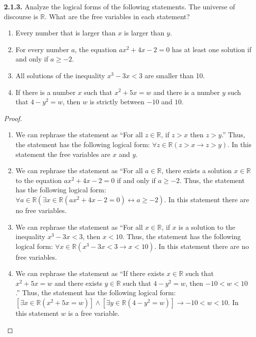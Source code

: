 \documentclass[12pt]{amsart}
\newenvironment{statement}[1]{\smallskip\noindent\color[rgb]{.6627, .3529, .6314} {\bf #1.}}{}
\theoremstyle{definition}
\theoremstyle{remark}
\newcommand{\BR}{\mathbb R}
\begin{document}
\begin{statement}{2.1.3}
Analyze the logical forms of the following statements.
The universe of discourse is $\BR$.
What are the free variables in each statement?
\begin{enumerate}
	\item Every number that is larger than $x$ is larger than $y$.
	
	\item For every number $a$, the equation $ax^2 + 4x - 2 = 0$ has at least one solution if and only if $a \geq -2$.
	
	\item All solutions of the inequality $x^3 - 3x < 3$ are smaller than 10.
	
	\item If there is a number $x$ such that $x^2 + 5x = w$ and there is a number $y$ such that $4 - y^2 = w$, then $w$ is strictly between $-10$ and $10$.
\end{enumerate}
\end{statement}

\begin{proof}
\hfill
\begin{enumerate}
	\item We can rephrase the statement as ``For all $z \in \BR$, if $z > x$ then $z > y$.''
	Thus, the statement has the following logical form:
	$\forall z \in \BR (z > x \rightarrow z > y)$.
	In this statement the free variables are $x$ and $y$.
	
	\item We can rephrase the statement as ``For all $a \in \BR$, there exists a solution $x \in \BR$ to the equation $ax^2 + 4x - 2 = 0$ if and only if $a \geq -2$.
	Thus, the statement has the following logical form:
	$\forall a \in \BR (\exists x \in \BR (ax^2 + 4x - 2 = 0) \leftrightarrow a \geq -2)$.
	In this statement there are no free variables.
	
	\item We can rephrase the statement as ``For all $x \in \BR$, if $x$ is a solution to the inequality $x^3 - 3x < 3$, then $x < 10$.
	Thus, the statement has the following logical form:
	$\forall x \in \BR (x^3 - 3x < 3 \rightarrow x < 10)$.
	In this statement there are no free variables.
	
	\item We can rephrase the statement as ``If there exists $x \in \BR$ such that $x^2 + 5x = w$ and there exists $y \in \BR$ such that $4 - y^2 = w$, then $-10 < w < 10$.''
	Thus, the statement has the following logical form:
	$[\exists x \in \BR (x^2 + 5x = w)] \wedge [\exists y \in \BR (4 - y^2 = w)] \rightarrow -10 < w < 10$.
	In this statement $w$ is a free variable.
\end{enumerate}
\end{proof}
\end{document}
